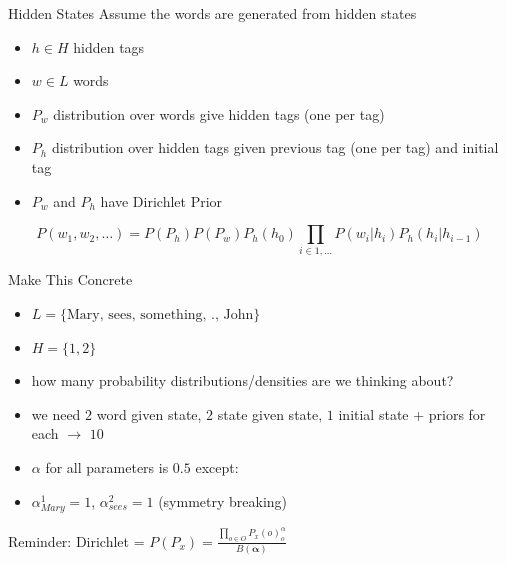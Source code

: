 \documentclass[11pt]{beamer}
\begin{document}
	\begin{frame}{Hidden States}
		\centering
		Assume the words are generated from hidden states
		
		\vspace{10pt}
		\begin{itemize}
			\item $h \in H$ hidden tags
			\item $w \in L$ words
			\item $P_w$ distribution over words give hidden tags (one per tag)
			\item $P_h$ distribution over hidden tags given previous tag (one per tag) and initial tag
			\item $P_w$ and $P_h$ have Dirichlet Prior
		\end{itemize}
		
		$$P(w_1,w_2,\dots) = P(P_h)P(P_w) P_h(h_0) \prod_{i \in 1,\dots} P(w_i|h_i)P_h(h_i|h_{i-1})$$
	\end{frame}
	
	\begin{frame}{Make This Concrete}
		
		\begin{itemize}
			\item<1-> $L = \{\mbox{Mary, sees, something, ., John}\}$
			\item<1-> $H = \{1,2\}$
			\item<1-> how many probability distributions/densities are we thinking about?
			\item<2-> we need $2$ word given state, $2$ state given state, $1$ initial state + priors for each $\rightarrow$ $10$
			\item<2-> $\alpha$ for all parameters is $0.5$ except:
			\item<2-> $\alpha_{Mary}^1 = 1$, $\alpha_{sees}^2 = 1$ (symmetry breaking)
		\end{itemize}
		
		
		\vspace{10pt}Reminder: Dirichlet = $P(P_x) = \frac{\prod_{o \in O} P_x(o)^\alpha_o}{B(\boldsymbol{\alpha})}$
	\end{frame}
	
\end{document}
